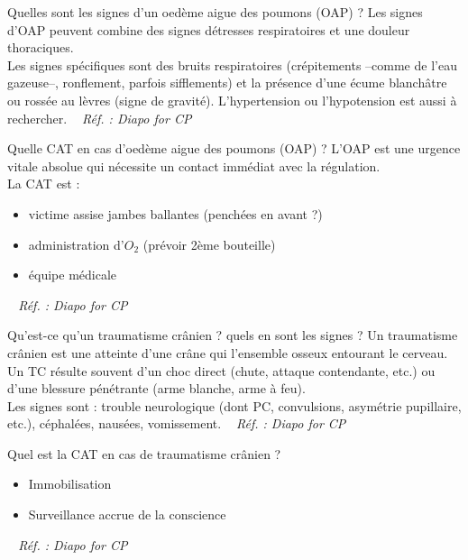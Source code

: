 \documentclass[grid,avery5371,landscape]{flashcards}
\makeatletter
\newcounter{nocarte}
\newcommand{\categ}[1]{%
  \def\@categ{#1}%
  \setcounter{nocarte}{0}%
}
\newcommand{\source}[1]{%
  \medskip
  \itshape%
   ~ \hfill Réf. : #1}
\makeatother
\begin{document}
\color[HTML]{01DF01}
\categ{CE-CP-REG}
\begin{flashcard}[bilan]{
 Quelles sont les signes d'un oedème aigue des poumons (OAP) ?   }
  Les signes d'OAP peuvent combine des signes détresses respiratoires et une douleur thoraciques. \\
    Les signes spécifiques sont des bruits respiratoires (crépitements --comme de l'eau gazeuse--, ronflement, parfois sifflements) et la présence d'une écume blanchâtre ou rossée au lèvres (signe de gravité). L'hypertension ou l'hypotension est aussi à rechercher.
  \source{Diapo for CP}
\end{flashcard}


\color[HTML]{01DF01}
\categ{CE-CP-REG}
\begin{flashcard}[CAT]{
 Quelle CAT en cas d'oedème aigue des poumons (OAP) ?   }
  L'OAP est une urgence vitale absolue qui nécessite un contact immédiat avec la régulation. \\
    La CAT est :
    \begin{itemize}
        \item victime assise jambes ballantes (penchées en avant ?)
        \item administration d'$O_2$ (prévoir 2ème bouteille)
        \item équipe médicale
    \end{itemize}
  \source{Diapo for CP}
\end{flashcard}


\color[HTML]{01DF01}
\categ{CE-CP-REG}
\begin{flashcard}[bilan]{
 Qu'est-ce qu'un traumatisme crânien ? quels en sont les signes ?    }
  Un traumatisme crânien est une atteinte d'une crâne qui l'ensemble osseux entourant le cerveau. \\
    Un TC résulte souvent d'un choc direct (chute, attaque contendante, etc.) ou d'une blessure pénétrante (arme blanche, arme à feu). \\
    Les signes sont : trouble neurologique (dont PC, convulsions, asymétrie pupillaire, etc.), céphalées, nausées, vomissement.
  \source{Diapo for CP}
\end{flashcard}


\color[HTML]{01DF01}
\categ{CE-CP-REG}
\begin{flashcard}[CAT]{
 Quel est la CAT en cas de traumatisme crânien ?    }
  \begin{itemize}
        \item Immobilisation
        \item Surveillance accrue de la conscience
    \end{itemize}
  \source{Diapo for CP}
\end{flashcard}
\end{document}
